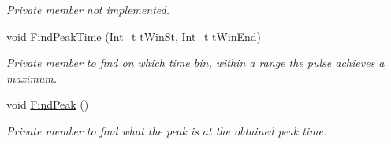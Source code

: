 \begin{DoxyCompactItemize}
\begin{DoxyCompactList}\small\item\em Private member not implemented. \end{DoxyCompactList}\item 
void \hyperlink{classPulse_a6465dc326f636cfdfeb0271899b4f350}{Find\+Peak\+Time} (Int\+\_\+t t\+Win\+St, Int\+\_\+t t\+Win\+End)
\begin{DoxyCompactList}\small\item\em Private member to find on which time bin, within a range the pulse achieves a maximum. \end{DoxyCompactList}\item 
void \hyperlink{classPulse_a09a13c062dc658a32a621ae72625676a}{Find\+Peak} ()
\begin{DoxyCompactList}\small\item\em Private member to find what the peak is at the obtained peak time. \end{DoxyCompactList}\end{DoxyCompactItemize}
